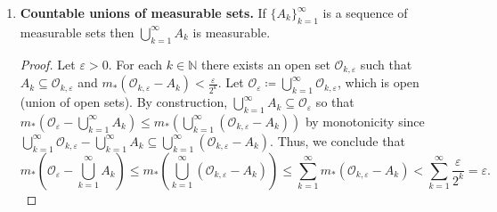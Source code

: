 \begin{enumerate}
	\begin{proof}\renewcommand{\qedsymbol}{}
	By sub-additivity, we have \( m_*(A_1 \cup A_2) \leq m_*(A_1) + m_*(A_2)  \), so we prove the converse inequality. Let \( \{ Q_k \}_{k=1} ^{\infty}  \) be a sequence of closed cubes such that \( A_1 \cup A_2 \subseteq \bigcup_{k=1}^{\infty} \mbox{vol}(Q_k)  \) and \( 0 < \delta < d(A_1, A_2) \). By sub-dividing the cubes, we may assume that \( \mbox{diam}(Q_k) = \sup_{}\{ |x-y| : x, y \in Q_k \} < \delta  \). For \( i = 1, 2 \) let \( K_i \coloneqq \{ k \in \mathbb{N} : Q_k \cap A_i \neq \emptyset  \} \). By summing we obtain \( m_*(A_1) + m_*(A_2) \leq \sum_{k \in K_1}^{}\mbox{vol}(Q_k) + \sum_{k \in K_2}^{}\mbox{vol}(Q_k)  \). By the choice of \( \delta \), \( K_1 \cap K_2 \neq \emptyset  \) so that \[\sum_{k \in K_1}^{}\mbox{vol}(Q_k) + \sum_{k \in K_2}^{}\mbox{vol}(Q_k) = \sum_{k \in K_1 \cup K_2}^{}\mbox{vol}(Q_k) \leq \sum_{k=1}^{\infty}\mbox{vol}(Q_k). \] By taking the infimum over all coverings \( Q_k \), we then obtain \( m_*(A_1) + m_*(A_2) \leq m_*(A_1 \cup A_2)  \) which completes the proof.
	\end{proof}
\item \textbf{Countable unions of measurable sets.} If \( \{ A_k \}_{k=1} ^{\infty}  \) is a sequence of measurable sets then \( \bigcup_{k=1}^{\infty} A_k \) is measurable.
	\begin{proof}\renewcommand{\qedsymbol}{}
	Let \( \varepsilon > 0 \). For each \( k \in \mathbb{N}  \) there exists an open set \( \mathcal{O}_{k,\varepsilon }  \) such that \( A_k \subseteq \mathcal{O} _{k,\varepsilon }  \) and \( m_*(\mathcal{O} _{k,\varepsilon } - A_k) < \frac{\varepsilon }{2^{k} }  \). Let \( \mathcal{O} _\varepsilon  \coloneqq\bigcup_{k=1}^{\infty} \mathcal{O} _{k,\varepsilon }  \), which is open (union of open sets). By construction, \( \bigcup_{k=1}^{\infty} A_k \subseteq \mathcal{O} _\varepsilon  \) so that \( m_*(\mathcal{O} _\varepsilon  - \bigcup_{k=1}^{\infty} A_k) \leq m_*(\bigcup_{k=1}^{\infty} (\mathcal{O} _{k,\varepsilon }  - A_k))   \) by monotonicity since \( \bigcup_{k=1}^{\infty} \mathcal{O} _{k,\varepsilon } - \bigcup_{k=1}^{\infty} A_k \subseteq \bigcup_{k=1}^{\infty} (\mathcal{O} _{k,\varepsilon } - A_k)  \). Thus, we conclude that \[m_*\left ( {\mathcal{O} _\varepsilon  - \bigcup_{k=1}^{\infty} A_k} \right ) \leq m_*\left ( {\bigcup_{k=1}^{\infty} (\mathcal{O} _{k,\varepsilon } - A_k)} \right )  \leq \sum_{k=1}^{\infty}m_*(\mathcal{O} _{k,\varepsilon } - A_k ) < \sum_{k=1}^{\infty}\frac{\varepsilon }{2^{k} } = \varepsilon .  \] 
	\end{proof}

\end{enumerate}
